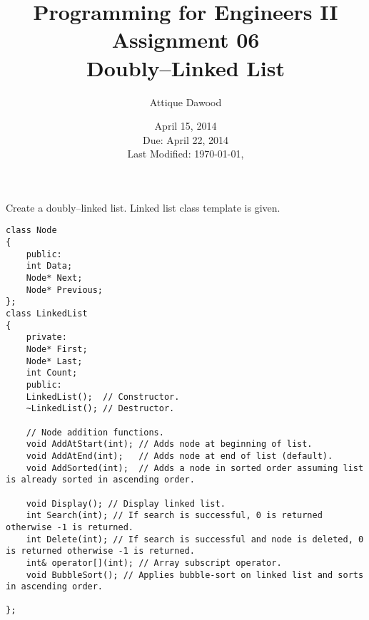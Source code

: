 \documentclass[12pt,a4paper]{article}
\title{\vspace{-2cm}Programming for Engineers II\\Assignment 06\\Doubly--Linked List}
\author{Attique Dawood}
\date{April 15, 2014\\Due: April 22, 2014\\[0.2cm] Last Modified: \today, \currenttime}
\begin{document}
\maketitle
Create a doubly--linked list. Linked list class template is given. 
\begin{lstlisting}
class Node
{
	public:
	int Data;
	Node* Next;
	Node* Previous;
};
class LinkedList
{
	private:
	Node* First;
	Node* Last;
	int Count;
	public:
	LinkedList();  // Constructor.
	~LinkedList(); // Destructor.
	
	// Node addition functions.
	void AddAtStart(int); // Adds node at beginning of list.
	void AddAtEnd(int);   // Adds node at end of list (default).
	void AddSorted(int);  // Adds a node in sorted order assuming list is already sorted in ascending order.
	
	void Display(); // Display linked list.
	int Search(int); // If search is successful, 0 is returned otherwise -1 is returned.
	int Delete(int); // If search is successful and node is deleted, 0 is returned otherwise -1 is returned.
	int& operator[](int); // Array subscript operator.
	void BubbleSort(); // Applies bubble-sort on linked list and sorts in ascending order.
	
};	
\end{lstlisting}
\end{document}
